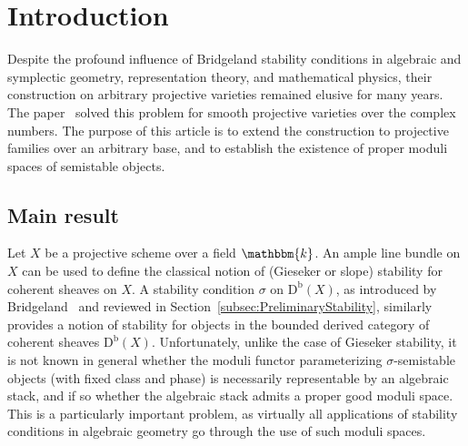 \documentclass[11pt, reqno]{amsart}
\numberwithin{equation}{section}
\theoremstyle{plain}
\theoremstyle{remark}
\theoremstyle{definition}
\theoremstyle{italicsname}
\newcommand{\Db}{\mathrm{D^b}}
\newcommand{\KK}{\mathbbm{k}}
\begin{document}

\begin{abstract}
We extend the construction of stability conditions on projective schemes over a field to projective families over an arbitrary base, and prove that they admit proper relative moduli spaces of semistable objects. 
We also prove a number of complementary results: the existence of mass-Hom bounds for these stability conditions, as conjectured by Halpern-Leistner and Robotis; a comparison with tilt-stability on surfaces and threefolds; a construction of stability conditions on the supported derived category of total spaces of certain vector bundles, including all local Calabi--Yau varieties; and a simple new proof of Bondal and Orlov's reconstruction theorem. 
\end{abstract}

\maketitle

\setcounter{tocdepth}{1}
\tableofcontents


\section{Introduction}\label{sec:intro}

Despite the profound influence of Bridgeland stability conditions in algebraic and symplectic geometry, representation theory, and mathematical physics, 
their construction on arbitrary projective varieties remained elusive for many years. 
The paper~\cite{chunyi-stability} solved this problem for smooth projective varieties over the complex numbers. 
The purpose of this article is to extend the construction to projective families over an arbitrary base, and to establish the existence of proper moduli spaces of semistable objects. 

\subsection{Main result}
\label{subsec:BridgelandIntro}

Let $X$ be a projective scheme over a field $\KK$. 
An ample line bundle on $X$ can be used to define the classical notion of (Gieseker or slope) stability for coherent sheaves on $X$. 
A stability condition $\sigma$ on $\Db(X)$, as introduced by Bridgeland~\cite{Bridgeland:Stab} and reviewed in Section~\ref{subsec:PreliminaryStability}, similarly provides a notion of stability for objects in the bounded derived category of coherent sheaves $\Db(X)$. 
Unfortunately, unlike the case of Gieseker stability, it is not known in general whether the moduli functor parameterizing $\sigma$-semistable objects (with fixed class and phase) is necessarily representable by an algebraic stack, and if so whether the algebraic stack admits a proper good moduli space. 
This is a particularly important problem, as virtually all applications of stability conditions in algebraic geometry go through the use of such moduli spaces. 
\end{document}
